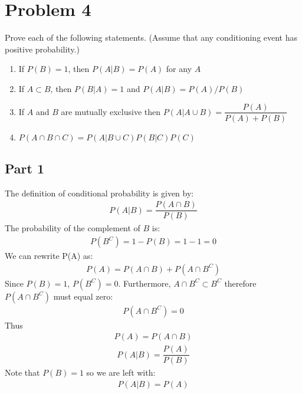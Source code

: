 \documentclass{article}
\begin{document}
\clearpage
\section*{Problem 4}
Prove each of the following statements. (Assume that any conditioning event has positive probability.)
\begin{enumerate}
\item
If $P(B) = 1$, then $P(A|B) = P(A)$ for any $A$
\item
If $A \subset B$, then $P(B|A) = 1$ and $P(A|B)=P(A)/P(B)$
\item
If $A$ and $B$ are mutually exclusive then $P(A|A\cup B) = \dfrac{P(A)}{P(A)+P(B)}$
\item
$P(A\cap B \cap C) = P(A|B\cup C) P(B|C) P(C)$
\end{enumerate}
\subsection*{Part 1}
The definition of conditional probability is given by:
\begin{align*}
P(A|B) = \dfrac{P(A\cap B)}{P(B)}
\end{align*}
The probability of the complement of $B$ is:
\begin{align*}
P(B^C) = 1-P(B) = 1-1 = 0
\end{align*}
We can rewrite P(A) as:
\begin{align*}
P(A) = P(A\cap B) + P(A\cap B^C)
\end{align*}
Since $P(B) = 1$, $P(B^C)=0$. Furthermore, $A\cap B^C\subset B^C$ therefore $P(A\cap B^C)$ must equal zero:
\begin{align*}
P(A\cap B^C) = 0
\end{align*}
Thus
\begin{align*}
P(A) = P(A\cap B)
\end{align*}
\begin{align*}
P(A|B) = \dfrac{P(A)}{P(B)}
\end{align*}
Note that $P(B)=1$ so we are left with:
\begin{align*}
\boxed{P(A|B) = P(A)}
\end{align*}
\end{document}
